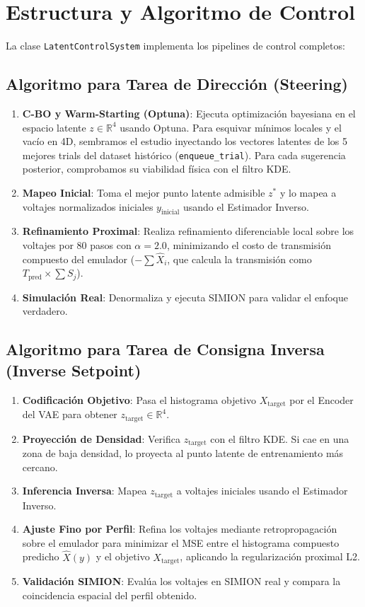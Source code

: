 \documentclass[12pt,letterpaper]{article}
\begin{document}
\section{Estructura y Algoritmo de Control}
La clase \texttt{LatentControlSystem} implementa los pipelines de control completos:

\subsection{Algoritmo para Tarea de Dirección (Steering)}
\begin{enumerate}
    \item \textbf{C-BO y Warm-Starting (Optuna)}: Ejecuta optimización bayesiana en el espacio latente $z \in \mathbb{R}^4$ usando Optuna. Para esquivar mínimos locales y el vacío en 4D, sembramos el estudio inyectando los vectores latentes de los 5 mejores trials del dataset histórico (\texttt{enqueue\_trial}). Para cada sugerencia posterior, comprobamos su viabilidad física con el filtro KDE.
    \item \textbf{Mapeo Inicial}: Toma el mejor punto latente admisible $z^*$ y lo mapea a voltajes normalizados iniciales $y_{\text{inicial}}$ usando el Estimador Inverso.
    \item \textbf{Refinamiento Proximal}: Realiza refinamiento diferenciable local sobre los voltajes por 80 pasos con $\alpha = 2.0$, minimizando el costo de transmisión compuesto del emulador ($-\sum \hat{X}_i$, que calcula la transmisión como $T_{\text{pred}} \times \sum S_j$).
    \item \textbf{Simulación Real}: Denormaliza y ejecuta SIMION para validar el enfoque verdadero.
\end{enumerate}

\subsection{Algoritmo para Tarea de Consigna Inversa (Inverse Setpoint)}
\begin{enumerate}
    \item \textbf{Codificación Objetivo}: Pasa el histograma objetivo $X_{\text{target}}$ por el Encoder del VAE para obtener $z_{\text{target}} \in \mathbb{R}^4$.
    \item \textbf{Proyección de Densidad}: Verifica $z_{\text{target}}$ con el filtro KDE. Si cae en una zona de baja densidad, lo proyecta al punto latente de entrenamiento más cercano.
    \item \textbf{Inferencia Inversa}: Mapea $z_{\text{target}}$ a voltajes iniciales usando el Estimador Inverso.
    \item \textbf{Ajuste Fino por Perfil}: Refina los voltajes mediante retropropagación sobre el emulador para minimizar el MSE entre el histograma compuesto predicho $\hat{X}(y)$ y el objetivo $X_{\text{target}}$, aplicando la regularización proximal L2.
    \item \textbf{Validación SIMION}: Evalúa los voltajes en SIMION real y compara la coincidencia espacial del perfil obtenido.
\end{enumerate}
\end{document}
